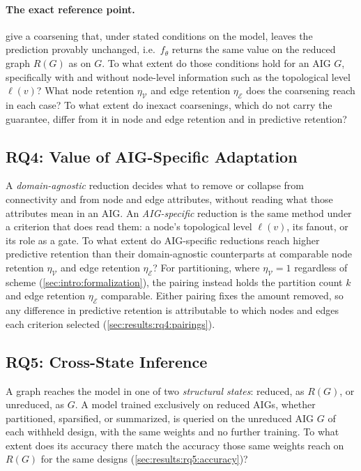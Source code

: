 \paragraph{The exact reference point.}
\citet{bollen2023exact} give a coarsening that, under stated conditions on the model, leaves
the prediction provably unchanged, i.e.\ $f_\theta$ returns the same value on the reduced
graph $R(G)$ as on $G$. To what extent do those conditions hold for an AIG $G$, specifically
with and without node-level information such as the topological level $\ell(v)$? What node
retention $\eta_{\mathcal{V}}$ and edge retention $\eta_{\mathcal{E}}$ does the coarsening
reach in each case? To what extent do inexact coarsenings, which do not carry the guarantee,
differ from it in node and edge retention and in predictive retention?

\subsection{RQ4: Value of AIG-Specific Adaptation}
\label{sec:intro:rq4}
A \emph{domain-agnostic} reduction decides what to remove or collapse from connectivity and
from node and edge attributes, without reading what those attributes mean in an AIG. An
\emph{AIG-specific} reduction is the same method under a criterion that does read them: a
node's topological level $\ell(v)$, its fanout, or its role as a gate. To what extent do
AIG-specific reductions reach higher predictive retention than their domain-agnostic
counterparts at comparable node retention $\eta_{\mathcal{V}}$ and edge retention
$\eta_{\mathcal{E}}$? For partitioning, where $\eta_{\mathcal{V}} = 1$ regardless of scheme
(\ref{sec:intro:formalization}), the pairing instead holds the partition count $k$ and edge
retention $\eta_{\mathcal{E}}$ comparable. Either pairing fixes the amount removed, so any
difference in predictive retention is attributable to which nodes and edges each criterion
selected (\ref{sec:results:rq4:pairings}).

\subsection{RQ5: Cross-State Inference}
\label{sec:intro:rq5}
A graph reaches the model in one of two \emph{structural states}: reduced, as $R(G)$, or
unreduced, as $G$. A model trained exclusively on reduced AIGs, whether partitioned,
sparsified, or summarized, is queried on the unreduced AIG $G$ of each withheld design, with
the same weights and no further training. To what extent does its accuracy there match the
accuracy those same weights reach on $R(G)$ for the same designs
(\ref{sec:results:rq5:accuracy})?

